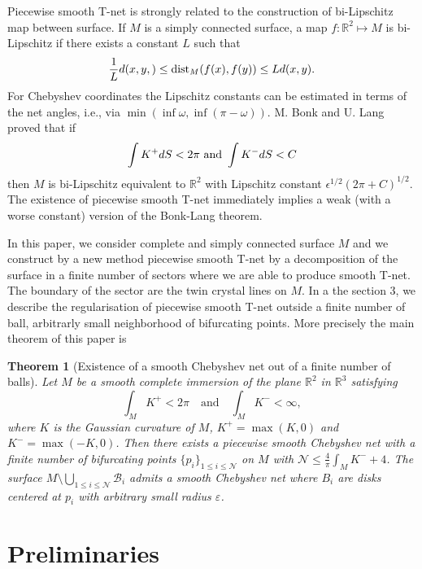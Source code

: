 \documentclass{article}
\newcommand{\R}{\mathbb{R}}
\newcommand{\surf}{M}
\newcommand{\N}{\mathcal{N}}
\newtheorem{theorem}{Theorem}
\theoremstyle{remark}
\theoremstyle{prpart}
\newcommand{\B}{\mathcal{B}}
\begin{document}
Piecewise smooth T-net is strongly related to the construction of bi-Lipschitz map between surface. If $M$ is a simply connected surface,
 a map $f: \R^2 \mapsto M$ is bi-Lipschitz if there exists a constant $L$ such that
 $$\frac1L d(x,y,) \leq {\rm dist}_M(f(x),f(y)) \leq L d(x,y).$$
For Chebyshev coordinates the Lipschitz constants can be estimated in terms of the net angles, i.e., via $\min \left( \inf \omega , \inf (\pi - \omega)\right)$.
M. Bonk and U. Lang \cite{bonk} proved that if
$$\int K^+ dS <2\pi \hbox{ and } \int K^- dS<C$$
then $M$ is bi-Lipschitz equivalent to $\R^2$ with Lipschitz constant $\epsilon^{1/2}(2\pi + C)^{1/2}$. The existence of piecewise smooth T-net immediately implies a weak (with a worse constant) version of the Bonk-Lang theorem. 

In this paper, we consider complete and simply connected surface $M$ and we construct by a new method piecewise smooth T-net
by a decomposition of the surface in a finite number of sectors where we are able to produce smooth T-net. 
The boundary of the sector are the twin crystal lines on $M$. In a the section 3, we describe the regularisation of piecewise smooth T-net
outside a finite number of ball, arbitrarly small neighborhood of bifurcating points. More precisely the main theorem of this paper is 


\begin{theorem}[Existence of a smooth Chebyshev net out of a finite
    number of balls]\label{thm:main_thm}
  Let $\surf$ be a smooth complete immersion of the plane $\R^2$ in $\R^3$ satisfying
\begin{equation} \label{eq:cond-thm}
  \int_{\surf}K^+<2\pi\quad\text{and}\quad\int_{\surf}K^-<\infty,
\end{equation}
where $K$ is the Gaussian curvature of $\surf$, $K^+=\max(K,0)$ and $K^-=\max(-K,0)$. 
Then there exists a piecewise smooth Chebyshev net with a finite number of bifurcating points $\{ p_i \}_{1\leq i\leq \N}$ on $M$ with 
$\N \leq  \frac{4}{\pi}\int_\surf K^-+4$. The surface $M\setminus\bigcup_{1\leq i\leq \N}\B_i$
admits a smooth Chebyshev net where $B_i$ are disks centered at $p_i$ with arbitrary small radius $\varepsilon$.  
\end{theorem}

\section{Preliminaries}
\end{document}
